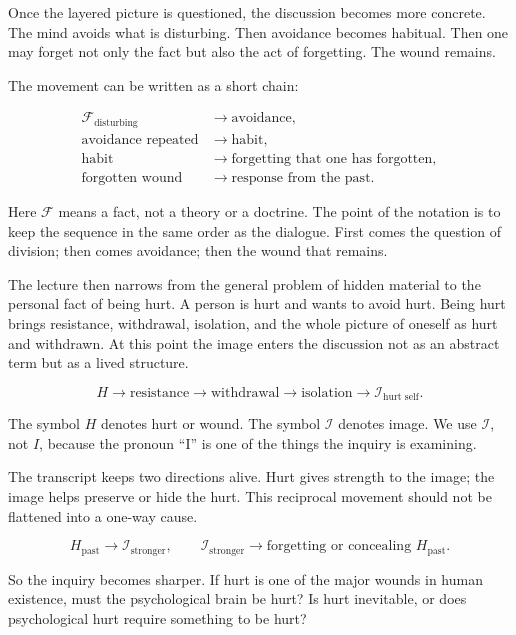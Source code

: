 Once the layered picture is questioned, the discussion becomes more concrete. The mind avoids what is disturbing. Then avoidance becomes habitual. Then one may forget not only the fact but also the act of forgetting. The wound remains.

The movement can be written as a short chain:

\begin{align}
\mathcal{F}_{\text{disturbing}}
&\to \text{avoidance}, \\
\text{avoidance repeated}
&\to \text{habit}, \\
\text{habit}
&\to \text{forgetting that one has forgotten}, \\
\text{forgotten wound}
&\to \text{response from the past}.
\end{align}

Here \(\mathcal{F}\) means a fact, not a theory or a doctrine. The point of the notation is to keep the sequence in the same order as the dialogue. First comes the question of division; then comes avoidance; then the wound that remains.

The lecture then narrows from the general problem of hidden material to the personal fact of being hurt. A person is hurt and wants to avoid hurt. Being hurt brings resistance, withdrawal, isolation, and the whole picture of oneself as hurt and withdrawn. At this point the image enters the discussion not as an abstract term but as a lived structure.

\begin{equation}
H \to \text{resistance} \to \text{withdrawal} \to \text{isolation} \to \mathcal{I}_{\text{hurt self}}.
\end{equation}

The symbol \(H\) denotes hurt or wound. The symbol \(\mathcal{I}\) denotes image. We use \(\mathcal{I}\), not \(I\), because the pronoun ``I'' is one of the things the inquiry is examining.

The transcript keeps two directions alive. Hurt gives strength to the image; the image helps preserve or hide the hurt. This reciprocal movement should not be flattened into a one-way cause.

\begin{equation}
H_{\text{past}} \to \mathcal{I}_{\text{stronger}},
\qquad
\mathcal{I}_{\text{stronger}} \to \text{forgetting or concealing }H_{\text{past}}.
\end{equation}

So the inquiry becomes sharper. If hurt is one of the major wounds in human existence, must the psychological brain be hurt? Is hurt inevitable, or does psychological hurt require something to be hurt?

